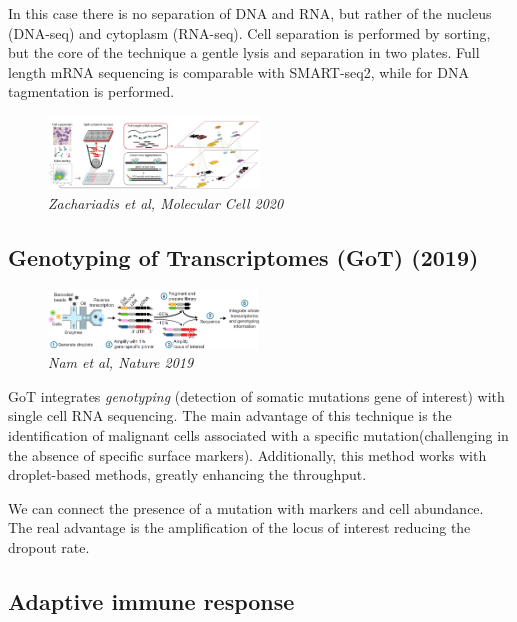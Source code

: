 In this case there is no separation of DNA and RNA, but rather of the
nucleus (DNA-seq) and cytoplasm (RNA-seq). Cell separation is performed
by sorting, but the core of the technique a gentle lysis and separation
in two plates. Full length mRNA sequencing is comparable with
SMART-seq2, while for DNA tagmentation is performed.

\begin{figure}
\centering
\includegraphics[width=0.5\textwidth]{images/Screenshot_4.png}
\caption{\emph{Zachariadis et al, Molecular Cell 2020}}
\end{figure}

\hypertarget{genotyping-of-transcriptomes-got-2019}{%
\subsection{Genotyping of Transcriptomes (GoT)
(2019)}\label{genotyping-of-transcriptomes-got-2019}}

\begin{figure}
\centering
\includegraphics[width=0.5\textwidth]{images/Screen_Shot_2023-02-22_at_20-38-39.png}
\caption{\emph{Nam et al, Nature 2019}}
\end{figure}

GoT integrates \emph{genotyping} (detection of somatic mutations gene of
interest) with single cell RNA sequencing. The main advantage of this
technique is the identification of malignant cells associated with a
specific mutation(challenging in the absence of specific surface
markers). Additionally, this method works with droplet-based methods,
greatly enhancing the throughput.

We can connect the presence of a mutation with markers and cell
abundance. The real advantage is the amplification of the locus of
interest reducing the dropout rate.

\hypertarget{adaptive-immune-response}{%
\subsection{Adaptive immune response}\label{adaptive-immune-response}}

